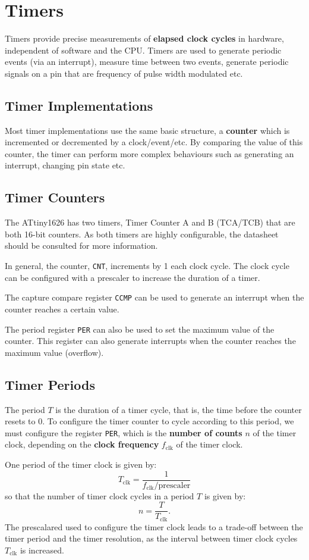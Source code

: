 \documentclass{report}
\begin{document}
\section{Timers}
Timers provide precise measurements of \textbf{elapsed clock cycles} in
hardware, independent of software and the CPU\@. Timers are used to
generate periodic events (via an interrupt), measure time between two
events, generate periodic signals on a pin that are frequency of pulse
width modulated etc.
\subsection{Timer Implementations}
Most timer implementations use the same basic structure, a
\textbf{counter} which is incremented or decremented by a
clock/event/etc. By comparing the value of this counter, the timer can
perform more complex behaviours such as generating an interrupt,
changing pin state etc.
\subsection{Timer Counters}
The ATtiny1626 has two timers, Timer Counter A and B (TCA/TCB) that are
both 16-bit counters. As both timers are highly configurable, the
datasheet should be consulted for more information.

In general, the counter, \texttt{CNT}, increments by 1 each
clock cycle. The clock cycle can be configured with a prescaler to
increase the duration of a timer.

The capture compare register \texttt{CCMP} can be used to
generate an interrupt when the counter reaches a certain value.

The period register \texttt{PER} can also be used to set the
maximum value of the counter. This register can also generate
interrupts when the counter reaches the maximum value (overflow).
\subsection{Timer Periods}
The period \(T\) is the duration of a timer cycle, that is, the time
before the counter resets to 0. To configure the timer counter to cycle
according to this period, we must configure the register
\texttt{PER}, which is the \textbf{number of counts} \(n\) of
the timer clock, depending on the \textbf{clock frequency}
\(f_\mathrm{clk}\) of the timer clock.

One period of the timer clock is given by:
\begin{equation*}
    T_\mathrm{clk} = \frac{1}{f_\mathrm{clk} / \mathrm{prescaler}}
\end{equation*}
so that the number of timer clock cycles in a period \(T\) is given by:
\begin{equation*}
    n = \frac{T}{T_\mathrm{clk}}.
\end{equation*}
The prescalared used to configure the timer clock leads to a trade-off between
the timer period and the timer resolution, as the interval between timer clock cycles \(T_\mathrm{clk}\)
is increased.
\end{document}
